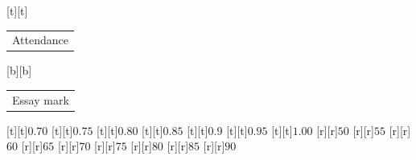 %    
%
%
\begin{psfrags}%
\psfragscanon%
%
[t][t]{\color[rgb]{0,0,0}\setlength{\tabcolsep}{0pt}\begin{tabular}{c}\Large{}Attendance\end{tabular}}%
[b][b]{\color[rgb]{0,0,0}\setlength{\tabcolsep}{0pt}\begin{tabular}{c}\Large{}Essay mark\end{tabular}}%
%
[t][t]{$0.70$}%
[t][t]{$0.75$}%
[t][t]{$0.80$}%
[t][t]{$0.85$}%
[t][t]{$0.9$}%
[t][t]{$0.95$}%
[t][t]{$1.00$}%
%
[r][r]{$50$}%
[r][r]{$55$}%
[r][r]{$60$}%
[r][r]{$65$}%
[r][r]{$70$}%
[r][r]{$75$}%
[r][r]{$80$}%
[r][r]{$85$}%
[r][r]{$90$}%
%
%
\end{psfrags}%
%
